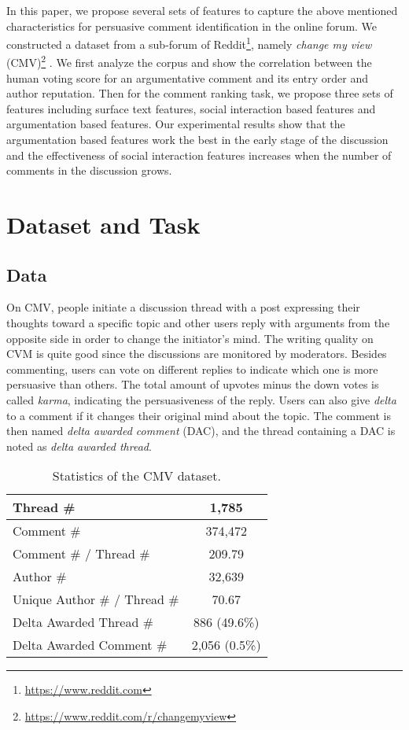 \documentclass[11pt]{article}
\begin{document}
In this paper, we propose several sets of features to capture the above mentioned characteristics for persuasive comment identification in the online forum. We constructed a dataset from a sub-forum of Reddit\footnote{\url{https://www.reddit.com}}, namely \emph{change my view} (CMV)\footnote{\url{https://www.reddit.com/r/changemyview}} . We first analyze the corpus and show the correlation between the human voting score for an argumentative comment and its entry order and author reputation. Then for the comment ranking task, we propose three sets of features including surface text features, social interaction based features and argumentation based features. Our experimental results show that the argumentation based features work the best in the early stage of the discussion and the effectiveness of social interaction features increases when the number of comments in the discussion grows.

\section{Dataset and Task}

\subsection{Data}

On CMV, people initiate a discussion thread with a post expressing their thoughts toward a specific topic and other users reply with arguments from the opposite side in order to change the initiator's mind. The writing quality on CVM is quite good since the discussions are monitored by moderators. Besides commenting, users can vote on different replies to indicate which one is more persuasive than others. The total amount of upvotes minus the down votes is called \emph{karma}, indicating the persuasiveness of the reply. Users can also give \emph{delta} to a comment if it changes their original mind about the topic. The comment is then named \emph{delta awarded comment} (DAC), and the thread containing a DAC is noted as \emph{delta awarded thread}. 


\begin{table}
\small
\begin{center}
\begin{tabular}{l|c}
\hline
Thread \# & 1,785 \\
\hline
Comment \# & 374,472\\
Comment \# / Thread \# & 209.79\\
Author \# & 32,639\\
Unique Author \# / Thread \# & 70.67\\
\hline
Delta Awarded Thread \# & 886 (49.6\%)\\
Delta Awarded Comment \# & 2,056 (0.5\%)\\
\hline
\end{tabular}
\end{center}
\caption{Statistics of the CMV dataset.}
\label{tab:CMV-corpus}
\end{table}
\end{document}
